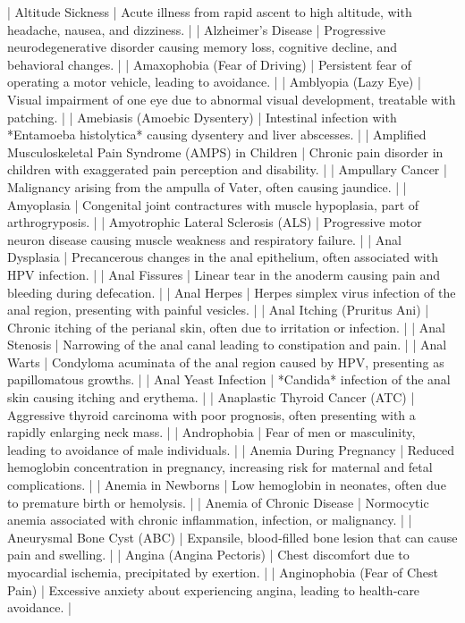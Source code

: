 | Altitude Sickness | Acute illness from rapid ascent to high altitude, with headache, nausea, and dizziness. |
| Alzheimer’s Disease | Progressive neurodegenerative disorder causing memory loss, cognitive decline, and behavioral changes. |
| Amaxophobia (Fear of Driving) | Persistent fear of operating a motor vehicle, leading to avoidance. |
| Amblyopia (Lazy Eye) | Visual impairment of one eye due to abnormal visual development, treatable with patching. |
| Amebiasis (Amoebic Dysentery) | Intestinal infection with *Entamoeba histolytica* causing dysentery and liver abscesses. |
| Amplified Musculoskeletal Pain Syndrome (AMPS) in Children | Chronic pain disorder in children with exaggerated pain perception and disability. |
| Ampullary Cancer | Malignancy arising from the ampulla of Vater, often causing jaundice. |
| Amyoplasia | Congenital joint contractures with muscle hypoplasia, part of arthrogryposis. |
| Amyotrophic Lateral Sclerosis (ALS) | Progressive motor neuron disease causing muscle weakness and respiratory failure. |
| Anal Dysplasia | Precancerous changes in the anal epithelium, often associated with HPV infection. |
| Anal Fissures | Linear tear in the anoderm causing pain and bleeding during defecation. |
| Anal Herpes | Herpes simplex virus infection of the anal region, presenting with painful vesicles. |
| Anal Itching (Pruritus Ani) | Chronic itching of the perianal skin, often due to irritation or infection. |
| Anal Stenosis | Narrowing of the anal canal leading to constipation and pain. |
| Anal Warts | Condyloma acuminata of the anal region caused by HPV, presenting as papillomatous growths. |
| Anal Yeast Infection | *Candida* infection of the anal skin causing itching and erythema. |
| Anaplastic Thyroid Cancer (ATC) | Aggressive thyroid carcinoma with poor prognosis, often presenting with a rapidly enlarging neck mass. |
| Androphobia | Fear of men or masculinity, leading to avoidance of male individuals. |
| Anemia During Pregnancy | Reduced hemoglobin concentration in pregnancy, increasing risk for maternal and fetal complications. |
| Anemia in Newborns | Low hemoglobin in neonates, often due to premature birth or hemolysis. |
| Anemia of Chronic Disease | Normocytic anemia associated with chronic inflammation, infection, or malignancy. |
| Aneurysmal Bone Cyst (ABC) | Expansile, blood‑filled bone lesion that can cause pain and swelling. |
| Angina (Angina Pectoris) | Chest discomfort due to myocardial ischemia, precipitated by exertion. |
| Anginophobia (Fear of Chest Pain) | Excessive anxiety about experiencing angina, leading to health‑care avoidance. |
